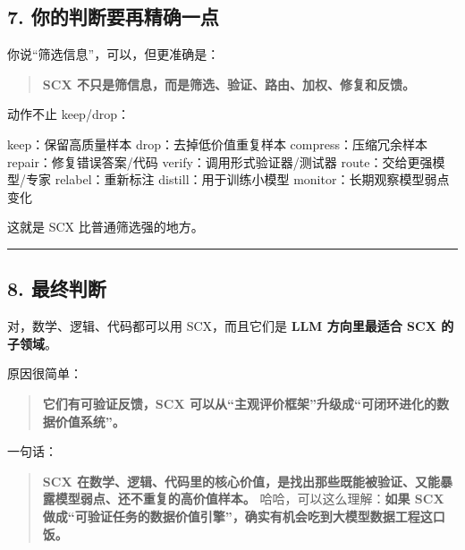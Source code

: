\documentclass[
  12pt,
]{ctexart}
\newenvironment{Shaded}{}{}
\newcommand{\NormalTok}[1]{#1}
\begin{document}
\subsection{7.
你的判断要再精确一点}\label{ux4f60ux7684ux5224ux65adux8981ux518dux7cbeux786eux4e00ux70b9}

你说``筛选信息''，可以，但更准确是：

\begin{quote}
\textbf{SCX 不只是筛信息，而是筛选、验证、路由、加权、修复和反馈。}
\end{quote}

动作不止 keep/drop：

\begin{Shaded}
\begin{Highlighting}[]
\NormalTok{keep：保留高质量样本}
\NormalTok{drop：去掉低价值重复样本}
\NormalTok{compress：压缩冗余样本}
\NormalTok{repair：修复错误答案/代码}
\NormalTok{verify：调用形式验证器/测试器}
\NormalTok{route：交给更强模型/专家}
\NormalTok{relabel：重新标注}
\NormalTok{distill：用于训练小模型}
\NormalTok{monitor：长期观察模型弱点变化}
\end{Highlighting}
\end{Shaded}

这就是 SCX 比普通筛选强的地方。

\begin{center}\rule{0.5\linewidth}{0.5pt}\end{center}

\subsection{8. 最终判断}\label{ux6700ux7ec8ux5224ux65ad-5}

对，数学、逻辑、代码都可以用 SCX，而且它们是 \textbf{LLM 方向里最适合
SCX 的子领域}。

原因很简单：

\begin{quote}
\textbf{它们有可验证反馈，SCX
可以从``主观评价框架''升级成``可闭环进化的数据价值系统''。}
\end{quote}

一句话：

\begin{quote}
\textbf{SCX
在数学、逻辑、代码里的核心价值，是找出那些既能被验证、又能暴露模型弱点、还不重复的高价值样本。}
哈哈，可以这么理解：\textbf{如果 SCX
做成``可验证任务的数据价值引擎''，确实有机会吃到大模型数据工程这口饭。}
\end{quote}
\end{document}
